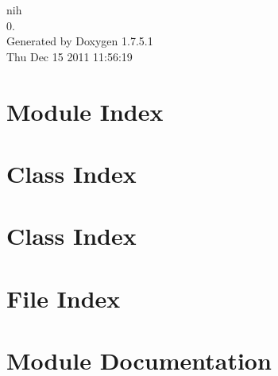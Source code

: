 \documentclass[a4paper]{book}
\begin{document}
\hypersetup{pageanchor=false,citecolor=blue}
\begin{titlepage}
\vspace*{7cm}
\begin{center}
{\Large nih \\[1ex]\large 0. }\\
\vspace*{1cm}
{\large \-Generated by Doxygen 1.7.5.1}\\
\vspace*{0.5cm}
{\small Thu Dec 15 2011 11:56:19}\\
\end{center}
\end{titlepage}
\clearemptydoublepage
{}
\tableofcontents
\clearemptydoublepage
{}
\hypersetup{pageanchor=true,citecolor=blue}
\chapter{\-Module \-Index}

\chapter{\-Class \-Index}

\chapter{\-Class \-Index}

\chapter{\-File \-Index}

\chapter{\-Module \-Documentation}























\end{document}
